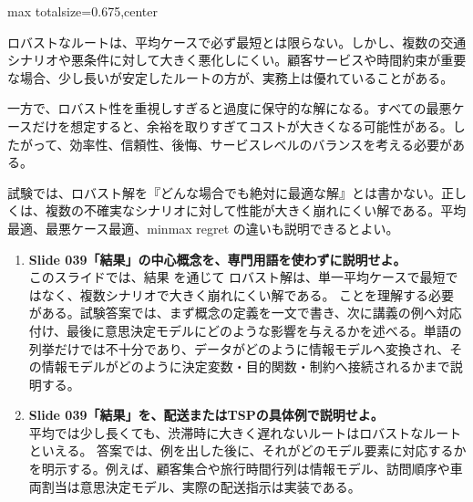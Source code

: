 \begin{adjustbox}{max totalsize={\textwidth}{0.675\textheight},center}
\begin{minipage}{\textwidth}
\begin{minipage}[t]{0.485\textwidth}
ロバストなルートは、平均ケースで必ず最短とは限らない。しかし、複数の交通シナリオや悪条件に対して大きく悪化しにくい。顧客サービスや時間約束が重要な場合、少し長いが安定したルートの方が、実務上は優れていることがある。\par
一方で、ロバスト性を重視しすぎると過度に保守的な解になる。すべての最悪ケースだけを想定すると、余裕を取りすぎてコストが大きくなる可能性がある。したがって、効率性、信頼性、後悔、サービスレベルのバランスを考える必要がある。\par
試験では、ロバスト解を『どんな場合でも絶対に最適な解』とは書かない。正しくは、複数の不確実なシナリオに対して性能が大きく崩れにくい解である。平均最適、最悪ケース最適、minmax regret の違いも説明できるとよい。\par
{}
\begin{enumerate}
\item \textbf{Slide 039「結果」の中心概念を、専門用語を使わずに説明せよ。}\\このスライドでは、結果 を通じて ロバスト解は、単一平均ケースで最短ではなく、複数シナリオで大きく崩れにくい解である。 ことを理解する必要がある。試験答案では、まず概念の定義を一文で書き、次に講義の例へ対応付け、最後に意思決定モデルにどのような影響を与えるかを述べる。単語の列挙だけでは不十分であり、データがどのように情報モデルへ変換され、その情報モデルがどのように決定変数・目的関数・制約へ接続されるかまで説明する。
\item \textbf{Slide 039「結果」を、配送またはTSPの具体例で説明せよ。}\\平均では少し長くても、渋滞時に大きく遅れないルートはロバストなルートといえる。 答案では、例を出した後に、それがどのモデル要素に対応するかを明示する。例えば、顧客集合や旅行時間行列は情報モデル、訪問順序や車両割当は意思決定モデル、実際の配送指示は実装である。
\end{enumerate}
\end{minipage}
\end{minipage}
\end{adjustbox}

